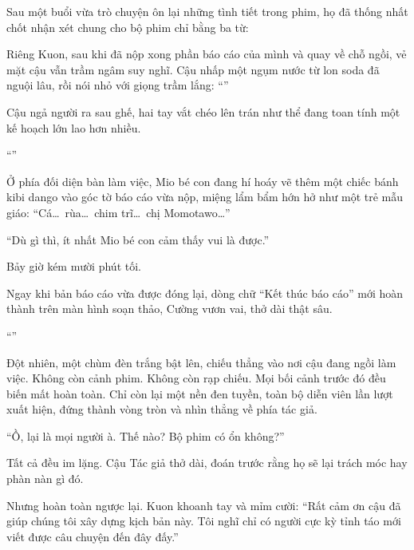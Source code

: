 \documentclass[../main.tex]{subfiles}
\begin{document}
Sau một buổi vừa trò chuyện ôn lại những tình tiết trong phim, họ đã thống nhất chốt nhận xét chung cho bộ phim chỉ bằng ba từ:


Riêng Kuon, sau khi đã nộp xong phần báo cáo của mình và quay về chỗ ngồi, vẻ mặt cậu vẫn trầm ngâm suy nghĩ. Cậu nhấp một ngụm nước từ lon soda đã nguội lâu, rồi nói nhỏ với giọng trầm lắng: ``''

Cậu ngả người ra sau ghế, hai tay vắt chéo lên trán như thể đang toan tính một kế hoạch lớn lao hơn nhiều.

``''


Ở phía đối diện bàn làm việc, Mio bé con đang hí hoáy vẽ thêm một chiếc bánh kibi dango vào góc tờ báo cáo vừa nộp, miệng lẩm bẩm hớn hở như một trẻ mẫu giáo: ``Cá\dots\ rùa\dots\ chim trĩ\dots\ chị Momotawo\dots''

``Dù gì thì, ít nhất Mio bé con cảm thấy vui là được.''

\ct

Bảy giờ kém mười phút tối.

Ngay khi bản báo cáo vừa được đóng lại, dòng chữ ``Kết thúc báo cáo'' mới hoàn thành trên màn hình soạn thảo, Cường vươn vai, thở dài thật sâu.

``''

Đột nhiên, một chùm đèn trắng bật lên, chiếu thẳng vào nơi cậu đang ngồi làm việc. Không còn cảnh phim. Không còn rạp chiếu. Mọi bối cảnh trước đó đều biến mất hoàn toàn. Chỉ còn lại một nền đen tuyền, toàn bộ diễn viên lần lượt xuất hiện, đứng thành vòng tròn và nhìn thẳng về phía tác giả.

``Ồ, lại là mọi người à. Thế nào? Bộ phim có ổn không?''

Tất cả đều im lặng. Cậu Tác giả thở dài, đoán trước rằng họ sẽ lại trách móc hay phàn nàn gì đó.

Nhưng hoàn toàn ngược lại. Kuon khoanh tay và mỉm cười: ``Rất cảm ơn cậu đã giúp chúng tôi xây dựng kịch bản này. Tôi nghĩ chỉ có người cực kỳ tỉnh táo mới viết được câu chuyện đến đây đấy.''
\end{document}
